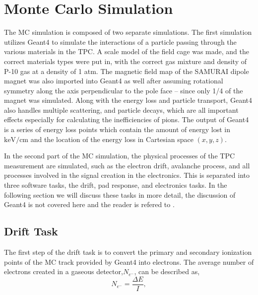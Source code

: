 


\section{Monte Carlo Simulation}
\label{sec:monteCarlo}

The MC simulation is composed of two separate simulations. The first simulation utilizes Geant4 to simulate the interactions of a particle passing through the various materials in the TPC. A scale model of the field cage was made, and the correct materials types were put in, with the correct gas mixture and density of P-10 gas at a density of 1 atm. The magnetic field map of the SAMURAI dipole magnet was also imported into Geant4 as well after assuming rotational symmetry along the axis perpendicular to the pole face -- since only 1/4 of the magnet was simulated. Along with the energy loss and particle transport, Geant4 also handles multiple scattering, and particle decays, which are all important effects especially for calculating the inefficiencies of pions. The output of Geant4 is a series of energy loss points which contain the amount of energy lost in $\si{\kilo\electronvolt\per\centi\metre}$ and the location of the energy loss in Cartesian space $(x,y,z)$. 

In the second part of the MC simulation, the physical processes of the TPC measurement are simulated, such as the electron drift, avalanche process, and all processes involved in the signal creation in the electronics. This is separated into three software tasks, the drift, pad response, and electronics tasks. In the following section we will discuss these tasks in more detail, the discussion of Geant4 is not covered here and the reader is refered to \cite{geant4}.  

\subsection{Drift Task}
 
 The first step of the drift task is to convert the primary and secondary ionization points of the MC track provided by Geant4 into electrons. The average number of electrons created in a gaseous detector,$N_{e^-}$, can be described as,
\begin{equation}
N_{e^{-}} =  \frac{\Delta E}{I},
\label{eq:kev2el}
\end{equation}
 
